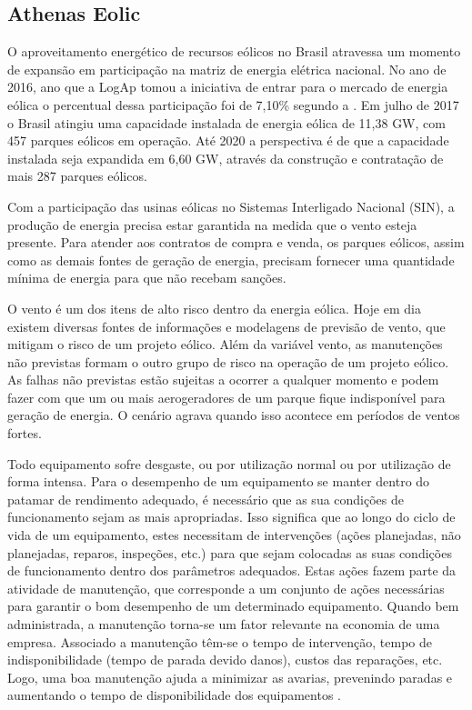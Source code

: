 \subsection{Athenas Eolic}
\label{Sec:athenasEolic}

O aproveitamento energético de recursos eólicos no Brasil atravessa um momento de expansão em participação na matriz de energia elétrica nacional. No ano de 2016, ano que a LogAp tomou a iniciativa de entrar para o mercado de energia eólica o percentual dessa participação foi de 7,10\% segundo a  . Em julho de 2017 o Brasil atingiu uma capacidade instalada de energia eólica de 11,38 GW, com 457 parques eólicos em operação. Até 2020 a perspectiva é de que a capacidade instalada seja expandida em 6,60 GW, através da construção e contratação de mais 287 parques eólicos.

Com a participação das usinas eólicas no Sistemas Interligado Nacional (SIN), a produção de energia precisa estar garantida na medida que o vento esteja presente. Para atender aos contratos de compra e venda, os parques eólicos, assim como as demais fontes de geração de energia, precisam fornecer uma quantidade mínima de energia para que não recebam sanções. 

O vento é um dos itens de alto risco dentro da energia eólica. Hoje em dia existem diversas fontes de informações e modelagens de previsão de vento, que mitigam o risco de um projeto eólico. Além da variável vento, as manutenções não previstas formam o outro grupo de risco na operação de um projeto eólico. As falhas não previstas estão sujeitas a ocorrer a qualquer momento e podem fazer com que um ou mais aerogeradores de um parque fique indisponível para geração de energia. O cenário agrava quando isso acontece em períodos de ventos fortes.

Todo equipamento sofre desgaste, ou por utilização normal ou por utilização de forma intensa. Para o desempenho de um equipamento se manter dentro do patamar de rendimento adequado, é necessário que as sua condições de funcionamento sejam as mais apropriadas. Isso significa que ao longo do ciclo de vida de um equipamento, estes necessitam de intervenções (ações planejadas, não planejadas, reparos, inspeções, etc.) para que sejam colocadas as suas condições de funcionamento dentro dos parâmetros adequados. Estas ações fazem parte da atividade de manutenção, que corresponde a um conjunto de ações necessárias para garantir o bom desempenho de um determinado equipamento. Quando bem administrada, a manutenção torna-se um fator relevante na economia de uma empresa. Associado a manutenção têm-se o tempo de intervenção, tempo de indisponibilidade (tempo de parada devido danos), custos das reparações, etc. Logo, uma boa manutenção ajuda a minimizar as avarias, prevenindo paradas e aumentando o tempo de disponibilidade dos equipamentos \cite{manutencao-sistemas-geracao-energia-renovavel}.

